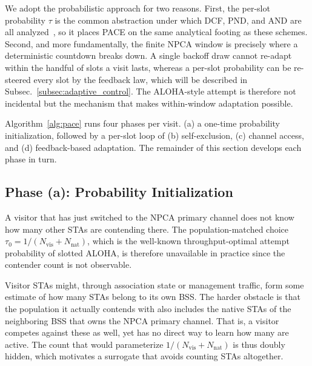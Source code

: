 \documentclass[conference]{IEEEtran}
\newcommand{\Nvis}{N_\mathrm{vis}}
\newcommand{\Nnat}{N_\mathrm{nat}}
\begin{document}
We adopt the probabilistic approach for two reasons. First, the
per-slot probability $\tau$ is the common abstraction under which DCF, PND, and
AND are all analyzed~\cite{bianchi2000performance,song2014pnd,vasudevan2013efficient},
so it places PACE on the same analytical footing as these schemes.
Second, and more fundamentally, the finite NPCA window is precisely
where a deterministic countdown breaks down. A single backoff draw cannot
re-adapt within the handful of slots a visit lasts, whereas a per-slot
probability can be re-steered every slot by the feedback law, which will be described in Subsec.~\ref{subsec:adaptive_control}. The
ALOHA-style attempt is therefore not incidental but the mechanism that makes
within-window adaptation possible.

Algorithm~\ref{alg:pace} runs four phases per visit. (a) a one-time probability
initialization, followed by a per-slot loop of (b) self-exclusion, (c) channel
access, and (d) feedback-based adaptation. The remainder of this section develops
each phase in turn.

\subsection{Phase (a): Probability Initialization}
\label{subsec:init}

A visitor that has just switched to the NPCA primary channel does not know how
many other STAs are contending there. The population-matched choice
$\tau_0=1/(\Nvis{+}\Nnat)$, which is the well-known throughput-optimal attempt probability of
slotted ALOHA, is therefore unavailable in practice since the contender count is not observable.

Visitor STAs might, through association state or management traffic, form some
estimate of how many STAs belong to its own BSS. The harder obstacle is that
the population it actually contends with also includes the native STAs of the
neighboring BSS that owns the NPCA primary channel. That is, a visitor competes against these as well, yet has no direct way to learn how many are active. The count that would
parameterize $1/(\Nvis{+}\Nnat)$ is thus doubly hidden, which motivates a surrogate that
avoids counting STAs altogether.
\end{document}
